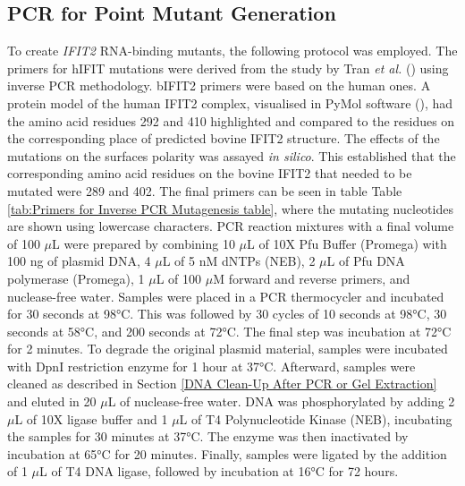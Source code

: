 \subsection{PCR for Point Mutant Generation} \label{subsec:PCR for Point Mutant Generation}
To create \textit{IFIT2} RNA-binding mutants, the following protocol was employed. The primers for hIFIT mutations were derived from the study by Tran \textit{et al.} (\cite{Tran2020InfluenzaMRNAs}) using inverse PCR methodology. bIFIT2 primers were based on the human ones. A protein model of the human IFIT2 complex, visualised in PyMol software (\cite{SchrodingerTeam2023TheSystem}), had the amino acid residues 292 and 410 highlighted and compared to the residues on the corresponding place of predicted bovine IFIT2 structure. The effects of the mutations on the surfaces polarity was assayed \textit{in silico}. This established that the corresponding amino acid residues on the bovine IFIT2 that needed to be mutated were 289 and 402. The final primers can be seen in table Table \ref{tab:Primers for Inverse PCR Mutagenesis table}, where the mutating nucleotides are shown using lowercase characters. PCR reaction mixtures with a final volume of 100 \(\mu\)L were prepared by combining 10 \(\mu\)L of 10X Pfu Buffer (Promega) with 100 ng of plasmid DNA, 4 \(\mu\)L of 5 nM dNTPs (NEB), 2 \(\mu\)L of Pfu DNA polymerase (Promega), 1 \(\mu\)L of 100 \(\mu\)M forward and reverse primers, and nuclease-free water. Samples were placed in a PCR thermocycler and incubated for 30 seconds at 98°C. This was followed by 30 cycles of 10 seconds at 98°C, 30 seconds at 58°C, and 200 seconds at 72°C. The final step was incubation at 72°C for 2 minutes. To degrade the original plasmid material, samples were incubated with DpnI restriction enzyme for 1 hour at 37°C. Afterward, samples were cleaned as described in Section \ref{DNA Clean-Up After PCR or Gel Extraction} and eluted in 20 \(\mu\)L of nuclease-free water. DNA was phosphorylated by adding 2 \(\mu\)L of 10X ligase buffer and 1 \(\mu\)L of T4 Polynucleotide Kinase (NEB), incubating the samples for 30 minutes at 37°C. The enzyme was then inactivated by incubation at 65°C for 20 minutes. Finally, samples were ligated by the addition of 1 \(\mu\)L of T4 DNA ligase, followed by incubation at 16°C for 72 hours.

